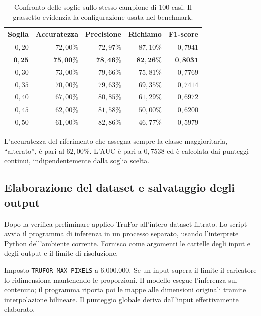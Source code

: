 \begin{table}[htbp]
    \centering
    \small
    \caption{Confronto delle soglie sullo stesso campione di 100 casi. Il grassetto evidenzia la configurazione usata nel benchmark.}
    \label{tab:trufor-confronto-soglie}
    \begin{tabular}{@{}rrrrr@{}}
        \toprule
        Soglia & Accuratezza & Precisione & Richiamo & F1-score \\
        \midrule
        $0{,}20$ & $72{,}00\%$ & $72{,}97\%$ & $87{,}10\%$ & $0{,}7941$ \\
        $\mathbf{0{,}25}$ & $\mathbf{75{,}00\%}$ & $\mathbf{78{,}46\%}$ & $\mathbf{82{,}26\%}$ & $\mathbf{0{,}8031}$ \\
        $0{,}30$ & $73{,}00\%$ & $79{,}66\%$ & $75{,}81\%$ & $0{,}7769$ \\
        $0{,}35$ & $70{,}00\%$ & $79{,}63\%$ & $69{,}35\%$ & $0{,}7414$ \\
        $0{,}40$ & $67{,}00\%$ & $80{,}85\%$ & $61{,}29\%$ & $0{,}6972$ \\
        $0{,}45$ & $62{,}00\%$ & $81{,}58\%$ & $50{,}00\%$ & $0{,}6200$ \\
        $0{,}50$ & $61{,}00\%$ & $82{,}86\%$ & $46{,}77\%$ & $0{,}5979$ \\
        \bottomrule
    \end{tabular}

    \medskip
    \begin{minipage}{0.9\linewidth}
        \small
        L'accuratezza del riferimento che assegna sempre la classe maggioritaria, ``alterato'', è pari al $62{,}00\%$. L'AUC è pari a $0{,}7538$ ed è calcolata dai punteggi continui, indipendentemente dalla soglia scelta.
    \end{minipage}
\end{table}

\subsection{Elaborazione del dataset e salvataggio degli output}
\label{sec:metodi-trufor-esecuzione}

Dopo la verifica preliminare applico TruFor all'intero dataset filtrato. Lo script  avvia il programma di inferenza in un processo separato, usando l'interprete Python dell'ambiente corrente. Fornisco come argomenti le cartelle degli input e degli output e il limite di risoluzione.

Imposto \texttt{TRUFOR\_MAX\_PIXELS} a 6.000.000. Se un input supera il limite il caricatore lo ridimensiona mantenendo le proporzioni. Il modello esegue l'inferenza sul contenuto; il programma riporta poi le mappe alle dimensioni originali tramite interpolazione bilineare. Il punteggio globale deriva dall'input effettivamente elaborato.


